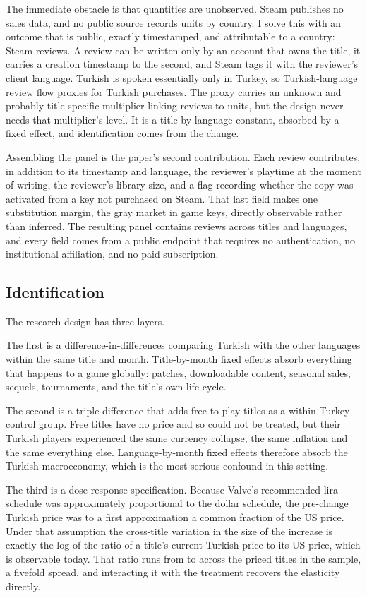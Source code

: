 \documentclass[11pt]{article}
\begin{document}
The immediate obstacle is that quantities are unobserved. Steam publishes no sales data, and no
public source records units by country. I solve this with an outcome that is public, exactly
timestamped, and attributable to a country: Steam reviews. A review can be written only by an
account that owns the title, it carries a creation timestamp to the second, and Steam tags it with
the reviewer's client language. Turkish is spoken essentially only in Turkey, so Turkish-language
review flow proxies for Turkish purchases. The proxy carries an unknown and probably
title-specific multiplier linking reviews to units, but the design never needs that multiplier's
level. It is a title-by-language constant, absorbed by a fixed effect, and identification comes
from the change.

Assembling the panel is the paper's second contribution. Each review contributes, in addition to
its timestamp and language, the reviewer's playtime at the moment of writing, the reviewer's
library size, and a flag recording whether the copy was activated from a key not purchased on
Steam. That last field makes one substitution margin, the gray market in game keys, directly
observable rather than inferred. The resulting panel contains \Nreviews{} reviews across \Ngames{}
titles and \Nlang{} languages, and every field comes from a public endpoint that requires no
authentication, no institutional affiliation, and no paid subscription.

\subsection*{Identification}

The research design has three layers.

The first is a difference-in-differences comparing Turkish with the other \Nlang{} languages
within the same title and month. Title-by-month fixed effects absorb everything that happens to a
game globally: patches, downloadable content, seasonal sales, sequels, tournaments, and the
title's own life cycle.

The second is a triple difference that adds free-to-play titles as a within-Turkey control group.
Free titles have no price and so could not be treated, but their Turkish players experienced the
same currency collapse, the same inflation and the same everything else. Language-by-month fixed
effects therefore absorb the Turkish macroeconomy, which is the most serious confound in this
setting.

The third is a dose-response specification. Because Valve's recommended lira schedule was
approximately proportional to the dollar schedule, the pre-change Turkish price was to a first
approximation a common fraction of the US price. Under that assumption the cross-title variation
in the size of the increase is exactly the log of the ratio of a title's current Turkish price to
its US price, which is observable today. That ratio runs from \doseMin{} to \doseMax{} across the \doseN{} priced titles in the sample, a
fivefold spread, and interacting it with the treatment recovers the elasticity directly.
\end{document}
